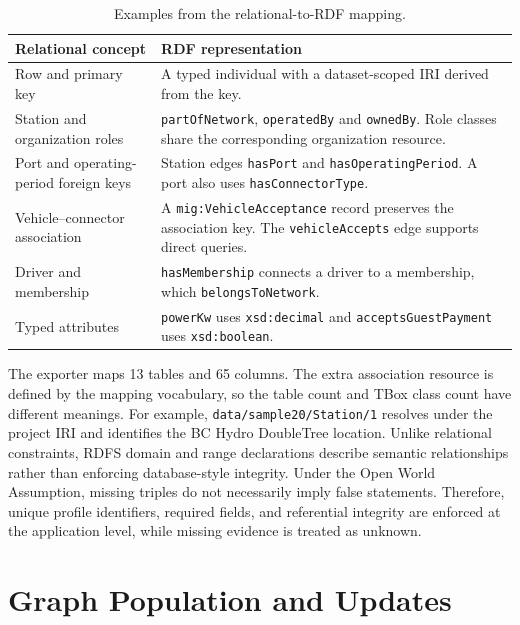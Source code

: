 \documentclass[sigconf,nonacm]{acmart}
\begin{document}
\begin{table}[t]
\caption{Examples from the relational-to-RDF mapping.}
\label{tab:mapping}
\small
\begin{tabularx}{\columnwidth}{@{}>{\raggedright\arraybackslash}p{}>{\raggedright\arraybackslash}X@{}}
\toprule
Relational concept & RDF representation \\
\midrule
Row and primary key & A typed individual with a dataset-scoped IRI derived from the key. \\
Station and organization roles & \texttt{partOfNetwork}, \texttt{operatedBy} and \texttt{ownedBy}. Role classes share the corresponding organization resource. \\
Port and operating-period foreign keys & Station edges \texttt{hasPort} and \texttt{hasOperatingPeriod}. A port also uses \texttt{hasConnectorType}. \\
Vehicle--connector association & A \texttt{mig:VehicleAcceptance} record preserves the association key. The \texttt{vehicleAccepts} edge supports direct queries. \\
Driver and membership & \texttt{hasMembership} connects a driver to a membership, which \texttt{belongsToNetwork}. \\
Typed attributes & \texttt{powerKw} uses \texttt{xsd:decimal} and \texttt{acceptsGuestPayment} uses \texttt{xsd:boolean}. \\
\bottomrule
\end{tabularx}
\end{table}

The exporter maps 13 tables and 65 columns. The extra association resource is defined by the mapping vocabulary, so the table count and TBox class count have different meanings. For example, \texttt{data/sample20/Station/1} resolves under the project IRI and identifies the BC Hydro DoubleTree location. Unlike relational constraints, RDFS domain and range declarations describe semantic relationships rather than enforcing database-style integrity. Under the Open World Assumption, missing triples do not necessarily imply false statements. Therefore, unique profile identifiers, required fields, and referential integrity are enforced at the application level, while missing evidence is treated as unknown.

\section{Graph Population and Updates}
\end{document}
